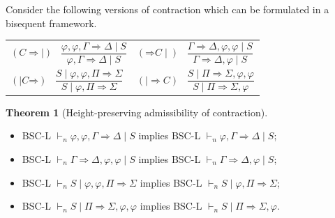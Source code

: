 \documentclass[11pt,a4paper,titlepage]{article}
\theoremstyle{definition}
\newtheorem{theorem}{\textbf{Theorem}}
\newcommand{\3}{\vspace{.3in}}
\newcommand{\2}{\vspace{.2in}}
\newcommand{\1}{\vspace{.1in}}
\newcommand{\5}{\vspace{.05in}}
\begin{document}
Consider the following versions of contraction which can be formulated in a bisequent framework. 

\noindent\begin{tabular}{ll}	
	$(\mathord{C}\mathord{\Rightarrow\mid})$ \ $\dfrac{\varphi,\varphi,\Gamma
		\Rightarrow \Delta \mid S}{\varphi, \Gamma \Rightarrow \Delta \mid S}$ &
	$(\mathord{\Rightarrow}\mathord{C\mid})$ \ $\dfrac{\Gamma
		\Rightarrow \Delta, \varphi, \varphi \mid S}{\Gamma
		\Rightarrow \Delta, \varphi \mid S}$\\[16pt]
	
	$(\mathord{\mid C}\mathord{\Rightarrow})$ \ $\dfrac{S \mid\varphi,\varphi, \Pi\Rightarrow\Sigma}{S\mid \varphi, \Pi\Rightarrow\Sigma}$ &
	$(\mathord{\mid\Rightarrow}\mathord{C})$ \ $\dfrac{S \mid \Pi\Rightarrow\Sigma, \varphi, \varphi}{S \mid \Pi\Rightarrow\Sigma, \varphi}$\\[16pt]	
\end{tabular}
\begin{theorem}[Height-preserving admissibility of contraction]\label{Contraction}
	$  $
\begin{itemize}\itemsep=0pt
\item	BSC-L $ \vdash_n\varphi,\varphi,\Gamma
\Rightarrow \Delta \mid S $ implies BSC-L $ \vdash_n\varphi,\Gamma
\Rightarrow \Delta \mid S $;
\item BSC-L $ \vdash_n\Gamma
\Rightarrow \Delta,\varphi,\varphi \mid S $ implies BSC-L $ \vdash_n\Gamma
\Rightarrow \Delta,\varphi \mid S $;
\item BSC-L $\vdash_nS \mid\varphi,\varphi, \Pi\Rightarrow\Sigma $ implies BSC-L $\vdash_nS \mid\varphi, \Pi\Rightarrow\Sigma $;
\item BSC-L $\vdash_nS \mid \Pi\Rightarrow\Sigma,\varphi,\varphi $ implies BSC-L $\vdash_nS \mid\Pi\Rightarrow\Sigma,\varphi $.
\end{itemize}
\end{theorem}
\end{document}
